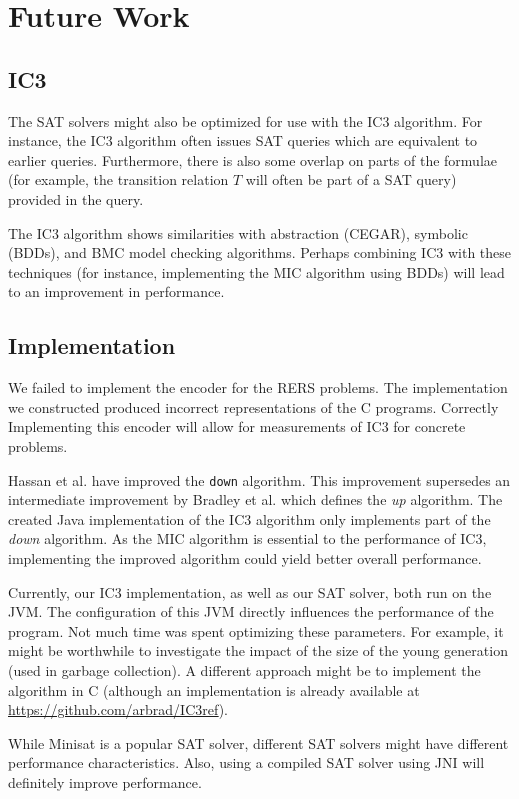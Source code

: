 \documentclass[a4paper]{article}
\begin{document}
\section{Future Work}
\subsection{IC3}
The SAT solvers might also be optimized for use with the IC3 algorithm. For instance, the IC3 algorithm often issues SAT queries which are equivalent to earlier queries. Furthermore, there is also some overlap on parts of the formulae (for example, the transition relation $T$ will often be part of a SAT query) provided in the query.

The IC3 algorithm shows similarities with abstraction (CEGAR), symbolic (BDDs), and BMC model checking algorithms. Perhaps combining IC3 with these techniques (for instance, implementing the MIC algorithm using BDDs) will lead to an improvement in performance.

\subsection{Implementation}
We failed to implement the encoder for the RERS problems. The implementation we constructed produced incorrect representations of the C programs. Correctly Implementing this encoder will allow for measurements of IC3 for concrete problems.

Hassan et al. \cite{Hassan2013} have improved the \texttt{down} algorithm. This improvement supersedes an intermediate improvement by Bradley et al. \cite{Bradley2007} which defines the \emph{up} algorithm. The created Java implementation of the IC3 algorithm only implements part of the \emph{down} algorithm. As the MIC algorithm is essential to the performance of IC3, implementing the improved algorithm could yield better overall performance.

Currently, our IC3 implementation, as well as our SAT solver, both run on the JVM. The configuration of this JVM directly influences the performance of the program. Not much time was spent optimizing these parameters. For example, it might be worthwhile to investigate the impact of the size of the young generation (used in garbage collection). A different approach might be to implement the algorithm in C (although an implementation is already available at \url{https://github.com/arbrad/IC3ref}).

While Minisat is a popular SAT solver, different SAT solvers might have different performance characteristics. Also, using a compiled SAT solver using JNI will definitely improve performance.
\end{document}
